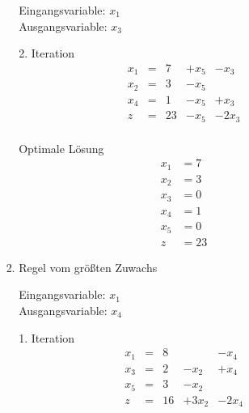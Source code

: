 \documentclass[a4paper]{scrartcl}
\begin{document}
\begin{enumerate}[label=\bfseries\arabic*.]
\begin{enumerate}
\begin{enumerate}[(i)]
\begin{enumerate}
                                Eingangsvariable: $x_1$ \\
                                Ausgangsvariable: $x_3$

                                2. Iteration
                                \begin{equation}
                                    \begin{array}{rcrrr}
                                        x_1 & = & 7 & +x_5 & -x_3 \\
                                        x_2 & = & 3 & -x_5 &  \\
                                        x_4 & = & 1 & -x_5 & +x_3 \\
                                        \hline
                                        z   & = & 23 & -x_5 & -2x_3 \\
                                    \end{array}
                                \end{equation}

                                Optimale Lösung
                                \begin{align*}
                                    x_1 &= 7 \\
                                    x_2 &= 3 \\
                                    x_3 &= 0 \\
                                    x_4 &= 1 \\
                                    x_5 &= 0 \\
                                    z   &= 23
                                \end{align*}

                            \item Regel vom größten Zuwachs

                                Eingangsvariable: $x_1$ \\
                                Ausgangsvariable: $x_4$

                                1. Iteration
                                \begin{equation}
                                    \begin{array}{rcrrr}
                                        x_1 & = & 8 &  & -x_4 \\
                                        x_3 & = & 2 & -x_2 & +x_4 \\
                                        x_5 & = & 3 & -x_2 &  \\
                                        \hline
                                        z   & = & 16 & +3x_2 & -2x_4 \\
                                    \end{array}
                                \end{equation}


\end{enumerate}
\end{enumerate}
\end{enumerate}
\end{enumerate}
\end{document}
